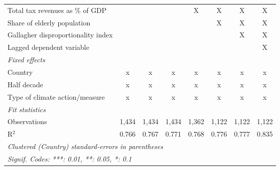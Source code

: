 \begin{table}[htbp]
\begin{tabular}{lccccccc}
      Total tax revenues as \% of GDP                                                             &         &         &         & X       & X             & X             & X\\  
      Share of elderly population                                                                 &         &         &         &         & X             & X             & X\\  
      Gallagher disproportionality index                                                          &         &         &         &         &               & X             & X\\  
      Lagged dependent variable                                                                   &         &         &         &         &               &               & X\\  
      \emph{Fixed effects}\\
      Country                                                                                     & x       & x       & x       & x       & x             & x             & x\\  
      Half decade                                                                                 & x       & x       & x       & x       & x             & x             & x\\  
      Type of climate action/measure                                                              & x       & x       & x       & x       & x             & x             & x\\  
      \midrule \emph{Fit statistics}\\
      Observations                                                                                & 1,434   & 1,434   & 1,434   & 1,362   & 1,122         & 1,122         & 1,122\\  
      R$^2$                                                                                       & 0.766   & 0.767   & 0.771   & 0.768   & 0.776         & 0.777         & 0.835\\  
      \midrule
      \multicolumn{8}{l}{\emph{Clustered (Country) standard-errors in parentheses}}\\
      \multicolumn{8}{l}{\emph{Signif. Codes: ***: 0.01, **: 0.05, *: 0.1}}\\
   \end{tabular}
\end{table}


